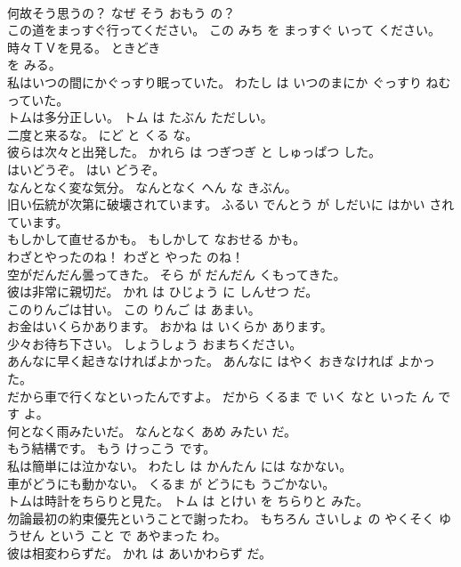 \documentclass[8pt]{extreport}
\begin{document}
\begin{CJK}{UTF8}{min}
\\	何故そう思うの？	なぜ そう おもう の？	
\\	この道をまっすぐ行ってください。	この みち を まっすぐ いって ください。	
\\	時々ＴＶを見る。	ときどき 
\\	を みる。	
\\	私はいつの間にかぐっすり眠っていた。	わたし は いつのまにか ぐっすり ねむっていた。	
\\	トムは多分正しい。	トム は たぶん ただしい。	
\\	二度と来るな。	にど と くる な。	
\\	彼らは次々と出発した。	かれら は つぎつぎ と しゅっぱつ した。	
\\	はいどうぞ。	はい どうぞ。	
\\	なんとなく変な気分。	なんとなく へん な きぶん。	
\\	旧い伝統が次第に破壊されています。	ふるい でんとう が しだいに はかい されています。	
\\	もしかして直せるかも。	もしかして なおせる かも。	
\\	わざとやったのね！	わざと やった のね！	
\\	空がだんだん曇ってきた。	そら が だんだん くもってきた。	
\\	彼は非常に親切だ。	かれ は ひじょう に しんせつ だ。	
\\	このりんごは甘い。	この りんご は あまい。	
\\	お金はいくらかあります。	おかね は いくらか あります。	
\\	少々お待ち下さい。	しょうしょう おまちください。	
\\	あんなに早く起きなければよかった。	あんなに はやく おきなければ よかった。	
\\	だから車で行くなといったんですよ。	だから くるま で いく なと いった ん です よ。	
\\	何となく雨みたいだ。	なんとなく あめ みたい だ。	
\\	もう結構です。	もう けっこう です。	
\\	私は簡単には泣かない。	わたし は かんたん には なかない。	
\\	車がどうにも動かない。	くるま が どうにも うごかない。	
\\	トムは時計をちらりと見た。	トム は とけい を ちらりと みた。	
\\	勿論最初の約束優先ということで謝ったわ。	もちろん さいしょ の やくそく ゆうせん という こと で あやまった わ。	
\\	彼は相変わらずだ。	かれ は あいかわらず だ。	

\end{CJK}
\end{document}
